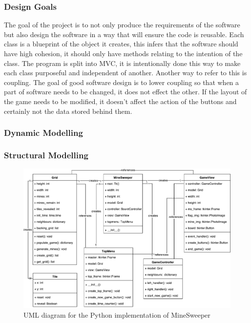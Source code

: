 \documentclass[12pt, a4]{report}
\begin{document}
	\subsubsection{Design Goals}
	\par The goal of the project is to not only produce the requirements of the software but also design the software in a way that will ensure the code is reusable. Each class is a blueprint of the object it creates, this infers that the software should have high cohesion, it should only have methods relating to the intention of the class. The program is split into MVC, it is intentionally done this way to make each class purposeful and independent of another. Another way to refer to this is coupling. The goal of good software design is to lower coupling so that when a part of software needs to be changed, it does not effect the other. If the layout of the game needs to be modified, it doesn't affect the action of the buttons and certainly not the data stored behind them. 
	
	\subsubsection{Dynamic Modelling}
	
	\begin{figure}[h]
		
		\caption{}
	\end{figure}
\pagebreak
	\subsubsection{Structural Modelling}
	\begin{figure}[!h]
		\centering
		\includegraphics[scale=0.6]{UML}
		\caption{UML diagram for the Python implementation of MineSweeper}
	\end{figure}
\pagebreak
	
\end{document}

